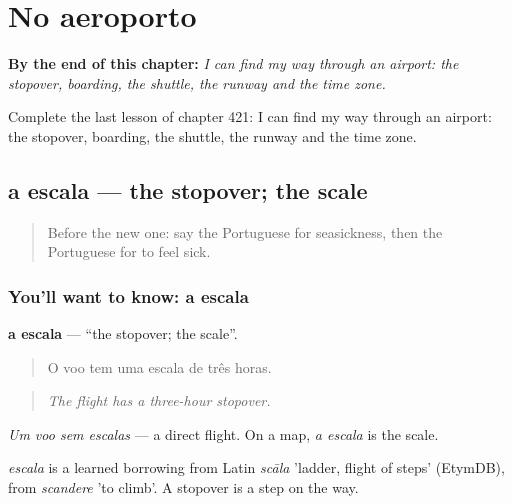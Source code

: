 
\chapter{No aeroporto}
\label{ch:pt-no-aeroporto}

\begin{chapteropening}
\textbf{By the end of this chapter:} \emph{I can find my way through an airport: the stopover, boarding, the shuttle, the runway and the time zone.}

Complete the last lesson of chapter 421: I can find my way through an airport: the stopover, boarding, the shuttle, the runway and the time zone.
\end{chapteropening}

\section[a escala]{a escala — the stopover; the scale}

\label{lesson:PT-C421-escala}



\begin{quote}
Before the new one: say the Portuguese for seasickness, then the Portuguese for to feel sick.
\end{quote}

\subsection*{You'll want to know: a escala}
\textbf{a escala} — \textquotedblleft{}the stopover; the scale\textquotedblright{}.

\begin{quote}
O voo tem uma escala de três horas.
\end{quote}

\begin{quote}
\emph{The flight has a three-hour stopover.}
\end{quote}

\emph{Um voo sem escalas} — a direct flight. On a map, \emph{a escala} is the scale.

\begin{cousinweb}
\emph{escala} is a learned borrowing from Latin \emph{scāla} 'ladder, flight of steps' (EtymDB), from \emph{scandere} 'to climb'. A stopover is a step on the way.
\end{cousinweb}

